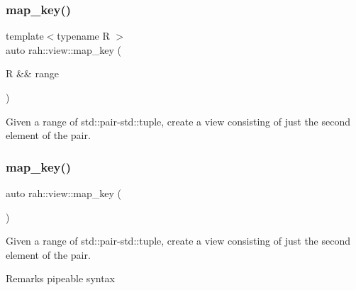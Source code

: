 \subsubsection{\texorpdfstring{map\_key()}{map\_key()}\hspace{0.1cm}{\footnotesize\ttfamily [1/2]}}
{\footnotesize\ttfamily template$<$typename R $>$ \\
auto rah\+::view\+::map\+\_\+key (\begin{DoxyParamCaption}\item[{R \&\&}]{range }\end{DoxyParamCaption})}



Given a range of std\+::pair-\/std\+::tuple, create a view consisting of just the second element of the pair. 


\begin{DoxyCodeInclude}{0}
\end{DoxyCodeInclude}
\mbox{\label{namespacerah_1_1view_aac8d9437b8c96e0e8e972c4c10d584e5}} 
\subsubsection{\texorpdfstring{map\_key()}{map\_key()}\hspace{0.1cm}{\footnotesize\ttfamily [2/2]}}
{\footnotesize\ttfamily auto rah\+::view\+::map\+\_\+key (\begin{DoxyParamCaption}{ }\end{DoxyParamCaption})}



Given a range of std\+::pair-\/std\+::tuple, create a view consisting of just the second element of the pair. 

\begin{DoxyRemark}{Remarks}
pipeable syntax
\end{DoxyRemark}

